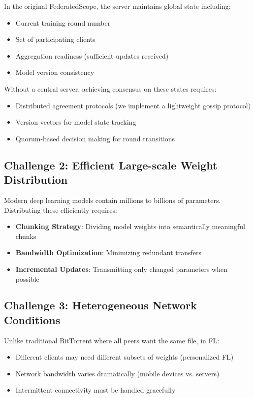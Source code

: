 \documentclass[11pt,conference]{article}
\begin{document}
In the original FederatedScope, the server maintains global state including:
\begin{itemize}
    \item Current training round number
    \item Set of participating clients
    \item Aggregation readiness (sufficient updates received)
    \item Model version consistency
\end{itemize}

Without a central server, achieving consensus on these states requires:
\begin{itemize}
    \item Distributed agreement protocols (we implement a lightweight gossip protocol)
    \item Version vectors for model state tracking
    \item Quorum-based decision making for round transitions
\end{itemize}

\subsection{Challenge 2: Efficient Large-scale Weight Distribution}

Modern deep learning models contain millions to billions of parameters. Distributing these efficiently requires:
\begin{itemize}
    \item \textbf{Chunking Strategy}: Dividing model weights into semantically meaningful chunks
    \item \textbf{Bandwidth Optimization}: Minimizing redundant transfers
    \item \textbf{Incremental Updates}: Transmitting only changed parameters when possible
\end{itemize}

\subsection{Challenge 3: Heterogeneous Network Conditions}

Unlike traditional BitTorrent where all peers want the same file, in FL:
\begin{itemize}
    \item Different clients may need different subsets of weights (personalized FL)
    \item Network bandwidth varies dramatically (mobile devices vs. servers)
    \item Intermittent connectivity must be handled gracefully
\end{itemize}
\end{document}
